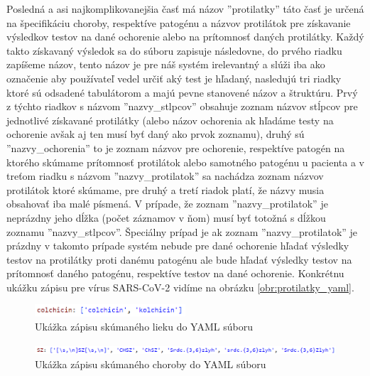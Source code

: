 Posledná a asi najkomplikovanejšia časť má názov ''protilatky'' táto časť je určená na špecifikáciu choroby, respektíve patogénu a názvov protilátok pre získavanie výsledkov testov na dané ochorenie alebo na prítomnosť daných protilátky. Každý takto získavaný výsledok sa do súboru zapisuje následovne, do prvého riadku zapíšeme názov, tento názov je pre náš systém irelevantný a slúži iba ako označenie aby používateľ vedel určiť aký test je hľadaný, nasledujú tri riadky ktoré sú odsadené tabulátorom a majú pevne stanovené názov a štruktúru. Prvý z týchto riadkov s názvom ''nazvy\_stlpcov'' obsahuje zoznam názvov stĺpcov pre jednotlivé získavané protilátky (alebo názov ochorenia ak hľadáme testy na ochorenie avšak aj ten musí byť daný ako prvok zoznamu), druhý sú ''nazvy\_ochorenia'' to je zoznam názvov pre ochorenie, respektíve patogén na ktorého skúmame prítomnosť protilátok alebo samotného patogénu u pacienta a v treťom riadku s názvom ''nazvy\_protilatok'' sa nachádza zoznam názvov protilátok ktoré skúmame, pre druhý a tretí riadok platí, že názvy musia obsahovať iba malé písmená. V prípade, že zoznam ''nazvy\_protilatok'' je neprázdny jeho dĺžka (počet záznamov v ňom) musí byť totožná s dĺžkou zoznamu ''nazvy\_stlpcov''. Špeciálny prípad je ak zoznam ''nazvy\_protilatok'' je prázdny v takomto prípade systém nebude pre dané ochorenie hľadať výsledky testov na protilátky proti danému patogénu ale bude hľadať výsledky testov na prítomnosť daného patogénu, respektíve testov na dané ochorenie. Konkrétnu ukážku zápisu pre vírus SARS-CoV-2 vidíme na obrázku \ref{obr:protilatky_yaml}.

\begin{figure}
	\centerline{\includegraphics[width=0.5\textwidth]{images/lieky_yaml}}
	\caption[Ukážka zápisu lieku]{Ukážka zápisu skúmaného lieku do YAML súboru}
	\label{obr:lieky_yaml}
\end{figure}

\begin{figure}
	\centerline{\includegraphics[width=1.05\textwidth]{images/choroby_yaml}}
	\caption[Ukážka zápisu choroby]{Ukážka zápisu skúmaného choroby do YAML súboru}
	\label{obr:choroby_yaml}
\end{figure}
  
